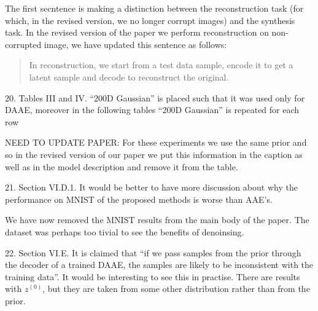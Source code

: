 \documentclass{article}
\begin{document}
{\color{red}
The first secntence is making a distinction between the reconstruction task (for which, in the revised version, we no longer corrupt images) and the synthesis task. In the revised version of the paper we perform reconstruction on non-corrupted image, we have updated this sentence as follows:

\begin{quote}
In reconstruction, we start from a test data sample, encode it to get a latent sample and decode to reconstruct the original. 
\end{quote}
}

{\color{blue}
20. Tables III and IV. ``200D Gaussian'' is placed such that it was used only for DAAE, moreover in the following tables ``200D Gaussian'' is repeated for each row\\
}

{\color{red} NEED TO UPDATE PAPER: For these experiments we use the same prior and so in the revised version of our paper we put this information in the caption as well as in the model description and remove it from the table.\\}

{\color{blue}
21. Section VI.D.1. It would be better to have more discussion about why the performance on MNIST of the proposed methods is worse than AAE's.\\
}

{\color{red} We have now removed the MNIST results from the main body of the paper. The dataset was perhaps too tivial to see the benefits of denoinsing.\\}

{\color{blue}
22. Section VI.E. It is claimed that ``if we pass samples from the prior through the decoder of a trained DAAE, the samples are likely to be inconsistent with the training data''. It would be interesting to see this in practise. There are results with $z^{(0)}$, but they are taken from some other distribution rather than from the prior.\\
}
\end{document}
